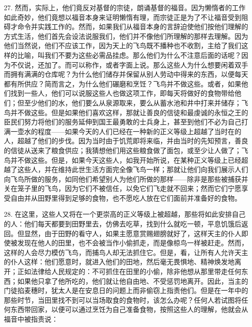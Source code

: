 27. 然而，实际上，他们竟反对基督的宗徒，朗诵基督的福音。因为懒惰者的工作如此奇妙，他们竟想以福音本身来证明懒惰有理，而宗徒正是为了不让福音受到阻碍才命令并实践工作的。然而，如果我们从福音本身的言辞迫使他们按他们理解的方式生活，他们首先会设法说服我们，他们并不像他们所理解的那样去理解。因为他们当然说，他们不应该工作，因为天上的飞鸟既不播种也不收割，主给了我们这样的比喻，叫我们不要为这些必需品挂虑。那么他们为什么不注意后面的话呢？因为不仅说，还加了。而可以称作，或者字面上说。那么这些人为什么想要闲着双手而拥有满满的仓库呢？为什么他们储存并保留从别人劳动中得来的东西，以便每天都有所供应？简而言之，为什么他们碾磨和烹饪？飞鸟并不做这些。或者，如果他们找到一些人，他们可以说服这些人也做这项工作，即每天将做好的食物带给他们；但至少他们的水，他们要么从泉源取来，要么从蓄水池和井中打来并储存；飞鸟并不做这些。但是如果他们喜欢这样，那就让善良的信徒和最虔诚的永恒之王的臣民们努力将他们的服务延伸到国王最勇敢的士兵身上，甚至到他们不必为自己打满一壶水的程度——如果今天的人们已经在一种新的正义等级上超越了当时在的人，超越了他们的步伐。因为当时由于饥荒即将来临，并由当时的先知预言，善良的信徒从送来了粮食供应；我猜想他们用这些粮食做了面包，或至少让人做了；飞鸟并不做这些。但是，如果今天这些人，如我开始所说，在某种正义等级上已经超越了这些人，并在维持此世生活方面完全像飞鸟一样；那就让他们向我们展示人们向飞鸟所做的服务，如同他们希望别人为他们所做的那样——除非是那些被捕获并关在笼子里的飞鸟，因为它们不被信任，以免它们飞走就不回来；然而它们宁愿享受自由并从田野里得到足够的食物，也不愿吃人放在它们面前并准备好的食物。\par

28. 在这里，这些人又将在一个更崇高的正义等级上被超越，那些将如此安排自己的人：他们每天都要到田野里去，仿佛去吃草，找到什么就吃一顿，平息饥饿后返回。但显然，由于田野的看守人，如果主愿意赏赐翅膀就好了，这样天主的仆人即使被发现在他人的田里，也不会被当作小偷抓走，而是像椋鸟一样被赶走。然而，这样的人会尽力模仿飞鸟，而捕鸟人却无法抓住它。但是，看，让所有人允许天主的仆人这样：他们愿意时，就进入他们的田地，然后毫无畏惧地、精神焕发地离开；正如法律给人民规定的：不可抓住在田里的小偷，除非他想从那里带走任何东西；如果他只拿了他所吃的，他们就让他自由地、不受惩罚地离开。因此，当主的门徒掐麦穗时，犹太人是在安息日的问题上而非偷窃上指责他们。但是在一年中的那些时节，当田里找不到可以当场取食的食物时，该怎么办呢？任何人若试图将任何东西带回家，以便可以通过烹饪为自己准备食物，按照这些人的理解，他就会从福音中被指责说：\par

